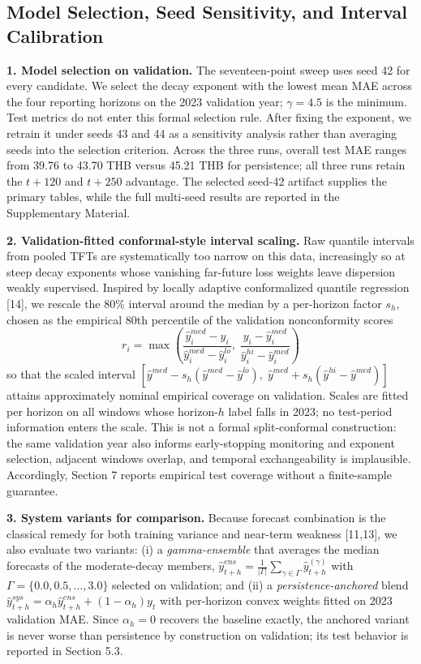 \documentclass[review,3p,times]{elsarticle}
\begin{document}
\subsection{Model Selection, Seed Sensitivity, and Interval Calibration}

\textbf{1. Model selection on validation.} The seventeen-point sweep uses seed 42 for every candidate. We select the decay exponent with the lowest mean MAE across the four reporting horizons on the 2023 validation year; $\gamma = 4.5$ is the minimum. Test metrics do not enter this formal selection rule. After fixing the exponent, we retrain it under seeds 43 and 44 as a sensitivity analysis rather than averaging seeds into the selection criterion. Across the three runs, overall test MAE ranges from 39.76 to 43.70 THB versus 45.21 THB for persistence; all three runs retain the $t+120$ and $t+250$ advantage. The selected seed-42 artifact supplies the primary tables, while the full multi-seed results are reported in the Supplementary Material.

\textbf{2. Validation-fitted conformal-style interval scaling.} Raw quantile intervals from pooled TFTs are systematically too narrow on this data, increasingly so at steep decay exponents whose vanishing far-future loss weights leave dispersion weakly supervised. Inspired by locally adaptive conformalized quantile regression [14], we rescale the 80\% interval around the median by a per-horizon factor $s_h$, chosen as the empirical 80th percentile of the validation nonconformity scores
\[r_i = \max\!\left(\frac{\hat{y}^{med}_i - y_i}{\hat{y}^{med}_i - \hat{y}^{lo}_i}, \; \frac{y_i - \hat{y}^{med}_i}{\hat{y}^{hi}_i - \hat{y}^{med}_i}\right)\]
so that the scaled interval $[\hat{y}^{med} - s_h(\hat{y}^{med} - \hat{y}^{lo}), \; \hat{y}^{med} + s_h(\hat{y}^{hi} - \hat{y}^{med})]$ attains approximately nominal empirical coverage on validation. Scales are fitted per horizon on all windows whose horizon-$h$ label falls in 2023; no test-period information enters the scale. This is not a formal split-conformal construction: the same validation year also informs early-stopping monitoring and exponent selection, adjacent windows overlap, and temporal exchangeability is implausible. Accordingly, Section 7 reports empirical test coverage without a finite-sample guarantee.

\textbf{3. System variants for comparison.} Because forecast combination is the classical remedy for both training variance and near-term weakness [11,13], we also evaluate two variants: (i) a \emph{gamma-ensemble} that averages the median forecasts of the moderate-decay members, $\hat{y}^{ens}_{t+h} = \frac{1}{|\Gamma|}\sum_{\gamma \in \Gamma} \hat{y}^{(\gamma)}_{t+h}$ with $\Gamma = \{0.0, 0.5, \dots, 3.0\}$ selected on validation; and (ii) a \emph{persistence-anchored} blend $\hat{y}^{sys}_{t+h} = \alpha_h \hat{y}^{ens}_{t+h} + (1-\alpha_h) y_t$ with per-horizon convex weights fitted on 2023 validation MAE. Since $\alpha_h = 0$ recovers the baseline exactly, the anchored variant is never worse than persistence by construction on validation; its test behavior is reported in Section 5.3.
\end{document}
